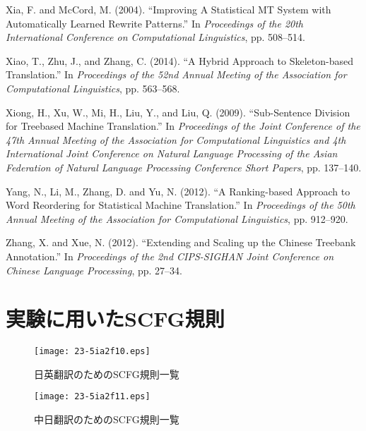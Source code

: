 \documentclass[japanese]{jnlp_1.4}
\begin{document}
\begin{thebibliography}{}
\item
Xia, F. and McCord, M. (2004). ``Improving A Statistical MT System with 
Automatically Learned Rewrite Patterns.'' In \textit{Proceedings of the 20th International Conference on Computational Linguistics}, pp. 508--514.

\item
Xiao, T., Zhu, J., and Zhang, C. (2014). ``A Hybrid Approach to 
Skeleton-based Translation.'' In \textit{Proceedings of the 52nd Annual Meeting of the Association for Computational Linguistics}, pp. 563--568.

\item
Xiong, H., Xu, W., Mi, H., Liu, Y., and Liu, Q. (2009). ``Sub-Sentence 
Division for Treebased Machine Translation.'' In \textit{Proceedings of the Joint Conference of the 47th Annual Meeting of the Association for Computational Linguistics and 4th International Joint Conference on Natural Language Processing of the Asian Federation of Natural Language Processing Conference Short Papers}, pp. 137--140.

\item
Yang, N., Li, M., Zhang, D. and Yu, N. (2012). ``A Ranking-based Approach to 
Word Reordering for Statistical Machine Translation.'' In \textit{Proceedings of the 50th Annual Meeting of the Association for Computational Linguistics}, pp. 912--920.

\item
Zhang, X. and Xue, N. (2012). ``Extending and Scaling up the Chinese 
Treebank Annotation.'' In \textit{Proceedings of the 2nd CIPS-SIGHAN Joint Conference on Chinese Language Processing}, pp. 27--34.

\end{thebibliography}




\appendix

\section{実験に用いたSCFG規則}

\begin{figure}[b]
\begin{center}
\texttt{[image: 23-5ia2f10.eps]}
\end{center}
\caption{日英翻訳のためのSCFG規則一覧}
\label{fig10}
\end{figure}
\begin{figure}[b]
\begin{center}
\texttt{[image: 23-5ia2f11.eps]}
\end{center}
\caption{中日翻訳のためのSCFG規則一覧}
\label{fig11}
\end{figure}
\end{document}
